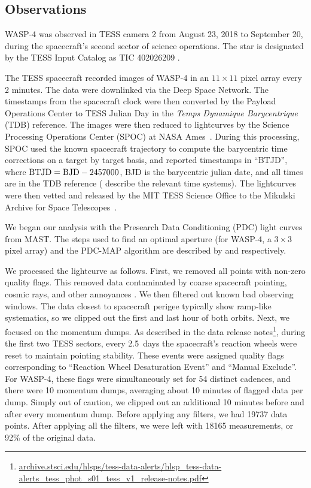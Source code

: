 \documentclass[12pt,twocolumn,tighten]{aastex62}
\begin{document}
\subsection{Observations}
\label{sec:observations}

WASP-4 was observed in TESS camera 2 from August 23, 2018 to September
20, during the spacecraft's second sector of science operations.  The
star is designated by the TESS Input Catalog as TIC 402026209
\citep{stassun_TIC_2018}.

The TESS spacecraft recorded images of WASP-4 in an $11\times11$ pixel
array every 2 minutes.   The data were downlinked via the Deep Space
Network. The timestamps from the spacecraft clock were then converted
by the Payload Operations Center to TESS Julian Day in the {\it
Temps Dynamique Barycentrique} (TDB) reference.  The images were then
reduced to lightcurves by the Science Processing Operations Center (SPOC)
at NASA Ames~\citep{jenkins_tess_2016}.  During this processing, SPOC used
the known
spacecraft trajectory to compute the barycentric time corrections on a
target by target basis, and reported timestamps in ``BTJD'', where
${\rm BTJD} = {\rm BJD} - 2457000$, BJD is the barycentric julian
date, and all times are in the TDB reference (\citealt{urban_explanatory_2012} 
describe the relevant time systems).
The lightcurves were then vetted and released by the MIT TESS Science
Office to the Mikulski Archive for Space
Telescopes~\citep{ricker_tess_alerts_2018}.

We began our analysis with the Presearch Data Conditioning (PDC) light
curves from MAST.  The steps used to find an optimal aperture (for
WASP-4, a $3\times 3$ pixel array) and the PDC-MAP algorithm are
described by \citet{smith_kepler_apertures_2017} and
\citet{smith_kepler_PDC_2017} respectively.

We processed the lightcurve as follows.  First, we removed all
points with non-zero quality flags.  This removed data contaminated by
coarse spacecraft pointing, cosmic rays, and other annoyances
\citep{tess_data_product_description_2018}.  We then filtered out
known bad observing windows.  The data closest to spacecraft perigee
typically show ramp-like systematics, so we clipped out the first and
last hour of both orbits.  Next, we focused on the momentum dumps. As
described in the data release
notes\footnote{\url{archive.stsci.edu/hlsps/tess-data-alerts/hlsp_tess-data-alerts_tess_phot_s01_tess_v1_release-notes.pdf}},
during the first two TESS sectors, every 2.5~days the spacecraft's
reaction wheels were reset to maintain pointing stability.  These
events were assigned quality flags corresponding to ``Reaction Wheel
Desaturation Event'' and ``Manual Exclude''.  For WASP-4, these flags
were simultaneously set for 54 distinct cadences, and there were 10
momentum dumps, averaging about 10 minutes of flagged data per dump.
Simply out of caution, we clipped out an additional 10 minutes before
and after every momentum dump.  Before applying any filters, we had
19737 data points. After applying all the filters, we were left with
18165 measurements, or 92\% of the original data.
\end{document}
